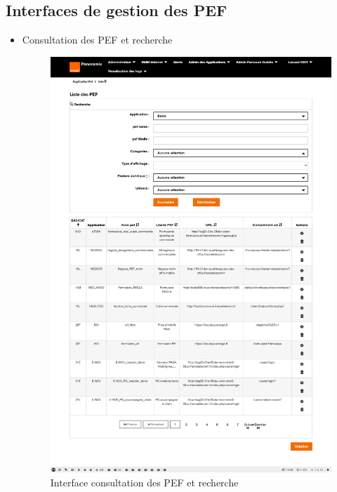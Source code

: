 \subsection{Interfaces de gestion des PEF}
\begin{itemize}
	\item Consultation des PEF et recherche
	\begin{figure}[H]
		\centering
		\includegraphics[width=0.55\linewidth]{img/screenshots/pef/index}
		\caption[Interface consultation des PEF et recherche]{Interface consultation des PEF et recherche}
		\label{fig:index-pef}
	\end{figure}


\end{itemize}
